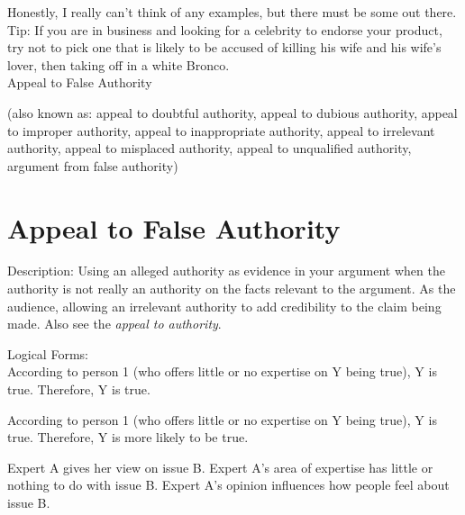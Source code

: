 \documentclass[a4paper,12pt,single,pdftex]{scrartcl}
\begin{document}
    
      Honestly, I really can’t think of any examples, but there must be some out there.
    \\

    
      Tip: If you are in business and looking for a celebrity to endorse your product, try not to pick one that is likely to be accused of killing his wife and his wife’s lover, then taking off in a white Bronco.
    \\

  

Appeal to False Authority
    
      (also known as: appeal to doubtful authority, appeal to dubious authority, appeal to improper authority, appeal to inappropriate authority, appeal to irrelevant authority, appeal to misplaced authority, appeal to unqualified authority, argument from false authority)
    \\

  
    \section{
      Appeal to False Authority
    }
  
    
    Description: Using an alleged authority as evidence in your argument when the authority is not really an authority on the facts relevant to the argument. As the audience, allowing an irrelevant authority to add credibility to the claim being made. Also see the {\em {\it appeal to authority}}.

    
      Logical Forms:
    \\

    
      According to person 1 (who offers little or no expertise on Y being true), Y is true. \newline
Therefore, Y is true.
    \\

     \newline

    

    
      According to person 1 (who offers little or no expertise on Y being true), Y is true. \newline
Therefore, Y is more likely to be true.
    \\

     \newline

    

    
      Expert A gives her view on issue B. \newline
Expert A’s area of expertise has little or nothing to do with issue B. \newline
Expert A’s opinion influences how people feel about issue B.
    \\
\end{document}

